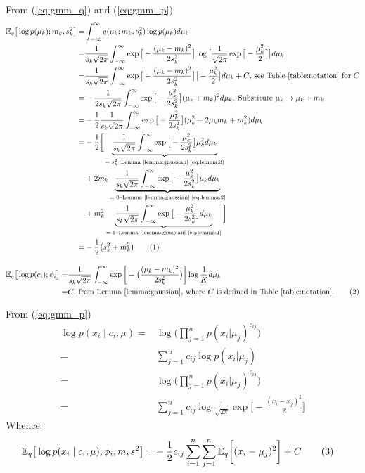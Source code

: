 \documentclass[]{article}
\newcommand{\Expectation} {\mathbb{E}}
\newcommand\numberthis    {\addtocounter{equation}{1}\tag{\theequation}}
\begin{document}
From (\ref{eq:gmm_q}) and (\ref{eq:gmm_p})
\begin{align*}
	 \Expectation_q \big[ \log {p(\mu_k);m_k,s_k^2}\big]  =& \int_{-\infty}^{\infty} q(\mu_k;m_k,s_k^2) \log {p(\mu_k)}  d\mu_k\\
	 =& \frac{1}{s_k\sqrt{2\pi}} \int_{-\infty}^{\infty} \exp{\big[-\frac{(\mu_k-m_k)^2}{2 s_k^2}\big]}\log{\big[\frac{1}{\sqrt{2\pi}} \exp{\big[- \frac{\mu_k^2}{2}\big]}\big]} d\mu_k\\
	 =&\frac{1}{s_k\sqrt{2\pi}} \int_{-\infty}^{\infty} \exp{\big[-\frac{(\mu_k-m_k)^2}{2 s_k^2}\big]}\big[ - \frac{\mu_k^2}{2}\big] d\mu_k+ C \text{, see Table \ref{table:notation} for $C$}\\
	 =& - \frac{1}{2 s_k\sqrt{2\pi}} \int_{-\infty}^{\infty} \exp{\big[-\frac{\mu_k^2}{2 s_k^2}\big]}(\mu_k+m_k)^2 d\mu_k \text{. Substitute $\mu_k \rightarrow \mu_k+m_k$}\\
	 =&- \frac{1}{2}\frac{1}{s_k\sqrt{2\pi} } \int_{-\infty}^{\infty} \exp{\big[-\frac{\mu_k^2}{2 s_k^2}\big]}(\mu_k^2 +2 \mu_k m_k + m_k^2) d\mu_k\\
	 =&- \frac{1}{2}\bigg[\underbrace{\frac{1}{s_k\sqrt{2\pi} } \int_{-\infty}^{\infty} \exp{\big[-\frac{\mu_k^2}{2 s_k^2}\big]}\mu_k^2  d\mu_k}_\text{$=s_k^2$--Lemma \ref{lemma:gaussian} \eqref{eq:lemma:3}}\\
	 \;&+2  m_k \underbrace{\frac{1}{s_k\sqrt{2\pi} } \int_{-\infty}^{\infty} \exp{\big[-\frac{\mu_k^2}{2 s_k^2}\big]} \mu_k  d\mu_k}_\text{$=0$--Lemma \ref{lemma:gaussian} \eqref{eq:lemma:2}}\\
	 \;&+m_k^2 \underbrace{\frac{1}{s_k\sqrt{2\pi} } \int_{-\infty}^{\infty} \exp{\big[-\frac{\mu_k^2}{2 s_k^2}\big]} d\mu_k}_\text{$=1$--Lemma \ref{lemma:gaussian} \eqref{eq:lemma:1}}\bigg]\\
	  =&- \frac{1}{2 } \big(s_k^2 +  m_k^2\big) \numberthis \label{eq:ELBO:1}
\end{align*}

\begin{align*}
	\Expectation_q\big[\log{p(c_i);\phi_i}\big] =& \frac{1}{s_k\sqrt{2\pi}} \int_{-\infty}^{\infty} \exp{\bigg[-\big(\frac{(\mu_k-m_k)^2}{2 s_k^2}\big)\bigg]} \log{\frac{1}{K}} d \mu_k\\
	=& C  \text{, from Lemma \ref{lemma:gaussian}, where $C$ is defined in Table \ref{table:notation}.} \numberthis \label{eq:ELBO:2}
\end{align*}

From  (\ref{eq:gmm_p})
\begin{align*}
	\log{p(x_i\mid c_i,\mu)} =& \log{\big(\prod_{j=1}^{n} p(x_i|\mu_j)^{c_{ij}}\big)}\\
	=&\sum_{j=1}^{n}c_{ij} \log{p(x_i|\mu_j)}\\
	=& \log{\big(\prod_{j=1}^{n} p(x_i|\mu_j)^{c_{ij}}\big)}\\
	=&\sum_{j=1}^{n}c_{ij} \log{\frac{1}{\sqrt{2\pi}} \exp{\big[-\frac{(x_i-x_j)^2}{2}\big]}}
\end{align*}
Whence:
\begin{align*}
	\Expectation_q\big[\log{p(x_i\mid c_i,\mu);\phi_i,m,s^2}\big] =& - \frac{1}{2} c_{ij} \sum_{i=1}^{n} \sum_{j=1}^{n} \Expectation_q\bigg[ (x_i-\mu_j)^2\bigg] + C \numberthis \label{eq:ELBO:3}
\end{align*}
\end{document}
